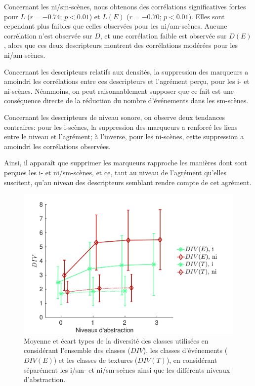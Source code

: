 Concernant les ni/sm-scènes, nous obtenons des corrélations significatives fortes pour $L$ ($r=-0.74$; $p<0.01$) et  $L(E)$ ($r=-0.70$; $p<0.01$). Elles sont cependant plus faibles que celles observées pour les ni/am-scènes. Aucune corrélation n'est observée sur $D$, et une corrélation faible est observée sur $D(E)$, alors que ces deux descripteurs montrent des corrélations modérées pour les ni/am-scènes.
 
Concernant les descripteurs relatifs aux densités, la suppression des marqueurs a amoindri les corrélations entre ces descripteurs et l'agrément perçu, pour les i- et ni-scènes. Néanmoins, on peut raisonnablement supposer que ce fait est une conséquence directe de la réduction du nombre d'événements dans les sm-scènes.

Concernant les descripteurs de niveau sonore, on observe deux tendances contraires: pour les i-scènes, la suppression des marqueurs a renforcé les liens entre le niveau et l'agrément; à l'inverse, pour les ni-scènes, cette suppression a amoindri les corrélations observées.

Ainsi, il apparaît que supprimer les marqueurs rapproche les manières dont sont perçues les i- et ni/sm-scènes, et ce, tant au niveau de l'agrément qu'elles suscitent, qu'au niveau des descripteurs semblant rendre compte de cet agrément.

\begin{figure}[t]
        \myfloatalign
        \includegraphics[width=.8\linewidth]{gfx/ch_5/xp4_div_1}
        \caption{Moyenne et écart types de la diversité des classes utilisées en considérant l'ensemble des classes ($DIV$), les classes d'événements ($DIV(E)$) et les classes de textures ($DIV(T)$), en considérant séparément les i/sm- et ni/sm-scènes ainsi que les différents niveaux d'abstraction.}\label{fig:diversitySansMarker}
\end{figure}

